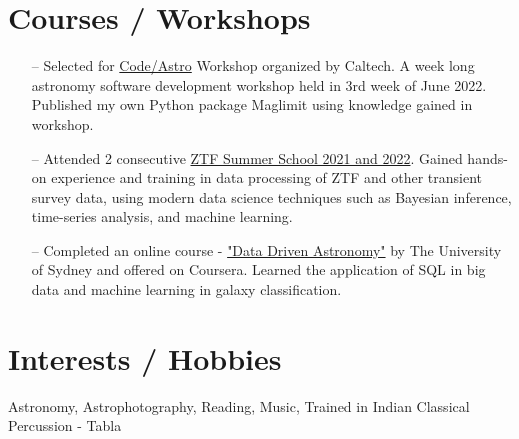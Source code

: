 \documentclass[a4paper,12pt]{article}
\begin{document}
\section{Courses / Workshops}
	\begin{itemize}[nosep,after=\strut, leftmargin=1em, itemsep=3pt]
		\item[--] Selected for \href{https://semaphorep.github.io/codeastro/}{Code/Astro} Workshop organized by Caltech. A week long astronomy software development workshop held in 3rd week of June 2022. Published my own Python package Maglimit using knowledge gained in workshop.
		\item[--] Attended 2 consecutive \href{https://www.ztf.caltech.edu/summer-school.html}{ZTF Summer School 2021 and 2022}. Gained hands-on experience and training in data processing of ZTF and other transient survey data, using modern data science techniques such as Bayesian inference, time-series analysis, and machine learning.
		\item[--] Completed an online course - \href{https://coursera.org/share/7c2b511fa13563535f7a46a3a930f365}{"Data Driven Astronomy"} by The University of Sydney and offered on Coursera. Learned the application of SQL in big data and  machine learning in galaxy classification.
	\end{itemize}


\section{Interests / Hobbies}
Astronomy, Astrophotography, Reading, Music, Trained in Indian Classical Percussion - Tabla






\vfill
{}
\end{document}
